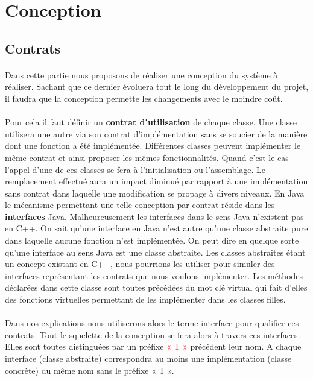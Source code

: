 \documentclass[a4paper,10pt]{report}
\begin{document}
\section{Conception}
\subsection{Contrats}
\paragraph*{}
Dans cette partie nous proposons de réaliser une conception du système à réaliser. Sachant que ce dernier évoluera tout 
le long du développement du projet, il faudra que la conception permette les changements avec le moindre coût. 
\paragraph*{}
Pour cela il faut définir un \textbf{contrat d’utilisation} de chaque classe. Une classe utilisera une autre via son contrat 
d’implémentation sans se soucier de la manière dont une fonction a été implémentée. Différentes classes peuvent 
implémenter le même contrat et ainsi proposer les mêmes fonctionnalités. Quand c’est le cas l’appel d’une de ces classes 
se fera à l’initialisation ou l’assemblage. Le remplacement effectué aura un impact diminué par rapport à une implémentation 
sans contrat dans laquelle une modification se propage à divers niveaux. \newline
En Java le mécanisme permettant une telle conception par contrat réside dans les \textbf{interfaces} Java. Malheureusement 
les interfaces dans le sens Java n’existent pas en C++. On sait qu’une interface en Java n’est autre qu’une classe 
abstraite pure dans laquelle aucune fonction n’est implémentée. On peut dire en quelque sorte qu’une interface au sens 
Java est une classe abstraite. Les classes abstraites étant un concept existant en C++, nous pourrions les utiliser 
pour simuler des interfaces représentant les contrats que nous voulons implémenter. Les méthodes déclarées dans cette 
classe sont toutes précédées du mot clé virtual qui fait d’elles des fonctions virtuelles permettant de les implémenter 
dans les classes filles.
\paragraph*{}
Dans nos explications nous utiliserons alors le terme interface pour qualifier ces contrats. Tout le squelette de la 
conception se fera alors à travers ces interfaces. Elles sont toutes distinguées par un préfixe \textcolor{red}{« I »} précédent leur nom. 
A chaque interface (classe abstraite) correspondra au moins une implémentation (classe concrète) du même nom sans le 
préfixe « I ».
\end{document}
